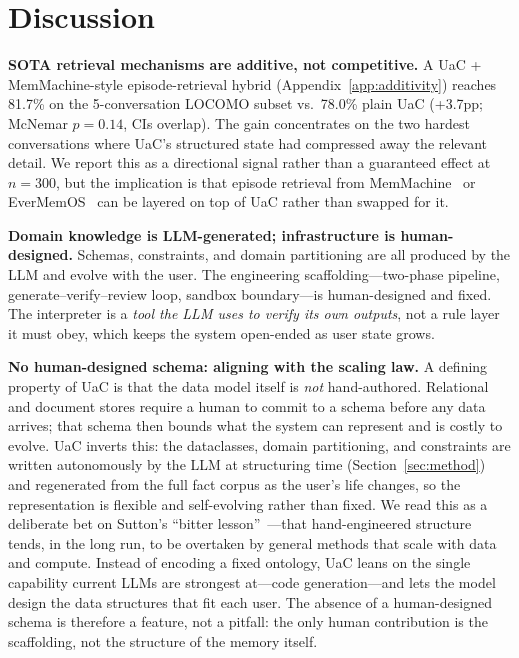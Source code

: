 \section{Discussion}

\textbf{SOTA retrieval mechanisms are additive, not competitive.} A UaC + MemMachine-style episode-retrieval hybrid (Appendix~\ref{app:additivity}) reaches 81.7\% on the 5-conversation LOCOMO subset vs.\ 78.0\% plain UaC (+3.7pp; McNemar $p{=}0.14$, CIs overlap). The gain concentrates on the two hardest conversations where UaC's structured state had compressed away the relevant detail. We report this as a directional signal rather than a guaranteed effect at $n{=}300$, but the implication is that episode retrieval from MemMachine~\citep{wang2026memmachine} or EverMemOS~\citep{hu2026evermemos} can be layered on top of UaC rather than swapped for it.

\textbf{Domain knowledge is LLM-generated; infrastructure is human-designed.} Schemas, constraints, and domain partitioning are all produced by the LLM and evolve with the user. The engineering scaffolding---two-phase pipeline, generate--verify--review loop, sandbox boundary---is human-designed and fixed. The interpreter is a \emph{tool the LLM uses to verify its own outputs}, not a rule layer it must obey, which keeps the system open-ended as user state grows.

\textbf{No human-designed schema: aligning with the scaling law.} A defining property of UaC is that the data model itself is \emph{not} hand-authored. Relational and document stores require a human to commit to a schema before any data arrives; that schema then bounds what the system can represent and is costly to evolve. UaC inverts this: the dataclasses, domain partitioning, and constraints are written autonomously by the LLM at structuring time (Section~\ref{sec:method}) and regenerated from the full fact corpus as the user's life changes, so the representation is flexible and self-evolving rather than fixed. We read this as a deliberate bet on Sutton's ``bitter lesson''~\citep{sutton2019bitter}---that hand-engineered structure tends, in the long run, to be overtaken by general methods that scale with data and compute. Instead of encoding a fixed ontology, UaC leans on the single capability current LLMs are strongest at---code generation---and lets the model design the data structures that fit each user. The absence of a human-designed schema is therefore a feature, not a pitfall: the only human contribution is the scaffolding, not the structure of the memory itself.

